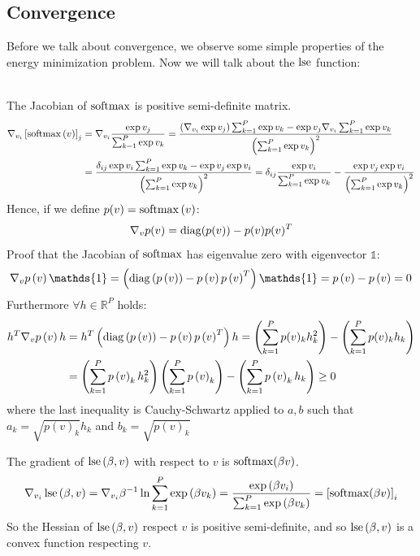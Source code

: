 \subsection{Convergence}
Before we talk about convergence, we observe some simple properties of the energy minimization problem. Now we will talk about the $\operatorname{lse}$ function:
\begin{remark}
\\
    The Jacobian of $\operatorname{softmax}$ is positive semi-definite matrix.
    \begin{align*}
        \nabla_{v_i}\left[\operatorname{softmax}\left(v\right)\right]_j &= \nabla_{v_i}\frac{\exp v_j}{\sum_{k=1}^{P}\exp v_k} = \frac{\left(\nabla_{v_i}\exp v_j\right)\sum_{k=1}^{P}\exp v_k-\exp v_j\nabla_{v_i}\sum_{k=1}^{P}\exp v_k}{\left(\sum_{k=1}^{P}\exp v_k\right)^2} \\
        &= \frac{\delta_{ij}\exp v_i\sum_{k=1}^{P}\exp v_k-\exp v_j\exp v_i}{\left(\sum_{k=1}^{P}\exp v_k\right)^2} = \delta_{ij}\frac{\exp v_i}{\sum_{k=1}^{P}\exp v_k}-\frac{\exp v_j\exp v_i}{\left(\sum_{k=1}^{P}\exp v_k\right)^2}
    \end{align*}
    Hence, if we define $p(v)=\operatorname{softmax}\left(v\right)$:
    \[
        \nabla_{v}p(v) = \operatorname{diag}(p(v))-p(v)p(v)^T
    \]
    Proof that the Jacobian of $\operatorname{softmax}$ has eigenvalue zero with eigenvector $\mathds{1}$:
    \[
        \nabla_{v}p\left(v\right)\mathds{1} = \left(\diagonal\left(p\left(v\right)\right)-p\left(v\right)p\left(v\right)^T\right)\mathds{1} = p\left(v\right) - p\left(v\right) = 0
    \]
    Furthermore $\forall h \in \mathbb{R}^P $ holds:
     \begin{align*}
         h^T \nabla_{v}p\left(v\right) h &= h^T \left( \operatorname{diag}\left(p\left(v\right)\right)-p\left(v\right)p\left(v\right)^T \right) h = \left(\sum_{k=1}^{P} p(v)_k h_k^2\right)- \left( \sum_{k=1}^P p(v)_k h_k \right)\\
         &= \left(\sum_{k=1}^{P} p\left(v\right)_k h_k^2\right)\left(\sum_{k=1}^P p\left(v\right)_k \right)- \left( \sum_{k=1}^P p\left(v\right)_k h_k \right) \geq 0
     \end{align*}
     where the last inequality is Cauchy-Schwartz applied to $a ,b$ such that $a_k=\sqrt{p\left(v\right)_k}h_k$ and $b_k = \sqrt{p\left(v\right)_k}$
\end{remark}
\begin{remark}
    The gradient of $\operatorname{lse}\left(\beta, v\right)$ with respect to $v$ is $\operatorname{softmax}(\beta v)$.
    \[
    \nabla_{v_i}\operatorname{lse}\left(\beta, v\right) = \nabla_{v_i}\beta^{-1}\ln\sum_{k=1}^{P}\exp\left(\beta v_k\right) = \frac{\exp\left(\beta v_i\right)}{\sum_{k=1}^{P}\exp\left(\beta v_k\right)} = \left[\operatorname{softmax}(\beta v)\right]_i
    \]
    So the Hessian of $\operatorname{lse}\left(\beta, v\right)$ respect $v$ is positive semi-definite, and so $\operatorname{lse}\left(\beta, v\right)$ is a convex function respecting $v$.
\end{remark}


